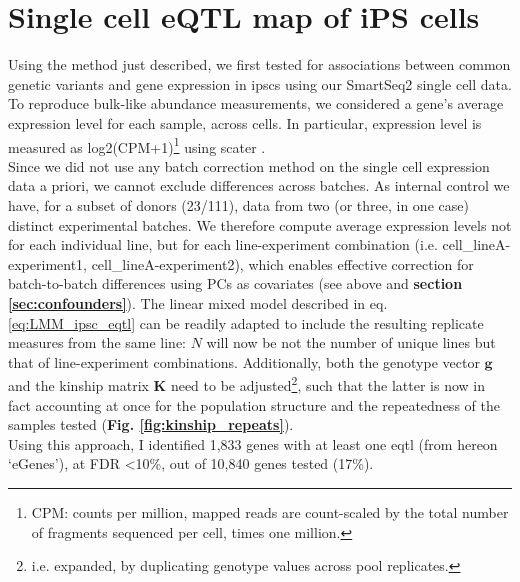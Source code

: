 \section{Single cell eQTL map of iPS cells}
\label{sec:sc_ipsc_eqtl}

Using the method just described, we first tested for associations between common genetic variants and gene expression in \glspl{ipsc} using our SmartSeq2 single cell data.
To reproduce bulk-like abundance measurements, we considered a gene's average expression level for each sample, across cells.
In particular, expression level is measured as log2(CPM+1)\footnote{CPM: counts per million, mapped reads are count-scaled by the total number of fragments sequenced per cell, times one million.} using scater \cite{mccarthy2017scater}.
\\

Since we did not use any batch correction method on the single cell expression data a priori, we cannot exclude differences across batches.
As internal control we have, for a subset of donors (23/111), data from two (or three, in one case) distinct experimental batches.
We therefore compute average expression levels not for each individual line, but for each line-experiment combination (i.e. cell\_lineA-experiment1, cell\_lineA-experiment2), which enables effective correction for batch-to-batch differences using PCs as covariates (see above and \textbf{section \ref{sec:confounders}}).
The linear mixed model described in eq. \eqref{eq:LMM_ipsc_eqtl} can be readily adapted to include the resulting replicate measures from the same line: $N$ will now be not the number of unique lines but that of line-experiment combinations.
Additionally, both the genotype vector $\mathbf{g}$ and the kinship matrix $\mathbf{K}$ need to be adjusted\footnote{i.e. expanded, by duplicating genotype values across pool replicates.}, such that the latter is now in fact accounting at once for the population structure and the repeatedness of the samples tested (\textbf{Fig. \ref{fig:kinship_repeats}}). \\

Using this approach, I identified 1,833 genes with at least one \gls{eqtl} (from hereon `eGenes'), at FDR <10\%, out of 10,840 genes tested (17\%). 

